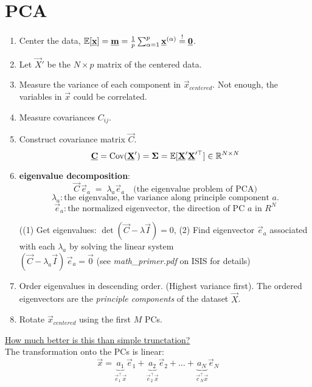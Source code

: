 \section{PCA}
\begin{enumerate}
\item Center the data, $\mathbb{E}[\underline{\mathbf{x}}] = \underline{\mathbf{m}}  = \frac{1}{p} \sum_{\alpha=1}^{p} \underline{\mathbf{x}}^{(\alpha)}\stackrel{\mathrm{!}}{=} \underline{\mathbf{0}}$.
\item Let $\vec X'$ be the $N \times p$ matrix of the centered data.
\item Measure the variance of each component in $\vec x_{centered}$. Not enough, the variables in $\vec x$ could be correlated.
\item Measure covariances $C_{ij}$.
\item Construct covariance matrix $\vec C$.\\
$$ 
\underline{\mathbf{C}} = \text{Cov}(\underline{\mathbf{X}}') = \mathbf{\Sigma} = \mathbb{E}[\underline{\mathbf{X}}' \underline{\mathbf{X}}'^\top] \in \mathbb{R}^{N \times N}
$$
\item \textbf{eigenvalue decomposition}:\\
$$
\vec C \, \vec e_a \; = \; \lambda_a \vec e_a  \quad\text{(the eigenvalue problem of PCA)}
$$
$$
\lambda_a: \text{the eigenvalue, the variance along principle component } a.
$$
$$
\vec e_a: \text{the normalized eigenvector, the direction of PC } a \text{ in } R^N
$$

((1) Get eigenvalues: $\det(\vec C-\lambda \vec I) = 0$, 
(2) Find eigenvector $\vec e_a$ associated with each $\lambda_a$ by solving the linear system\\
$ (\vec C - \lambda_a \vec I )\, \vec e_a = \vec 0$
(see {\emph{math\_primer.pdf} on ISIS}  for details)
\item Order eigenvalues in descending order. (Highest variance first). The ordered eigenvectors are the \emph{principle components} of the dataset $\vec X$.


\item Rotate $\vec x_{centered}$ using the first $M$ PCs.
\end{enumerate}


\underline{How much better is this than simple trunctation?}\\[0.3cm]
The transformation onto the PCs is linear:
\begin{equation*}
	\vec{x} = \underbrace{ a_1 }_{ \vec{e}_1^\top \vec{x} } \vec{e}_1
		+ \underbrace{ a_2 }_{ \vec{e}_2^\top \vec{x} } \vec{e}_2
		+ \ldots
		+ \underbrace{ a_N }_{ \vec{e}_N^\top \vec{x} } \vec{e}_N
\end{equation*}

